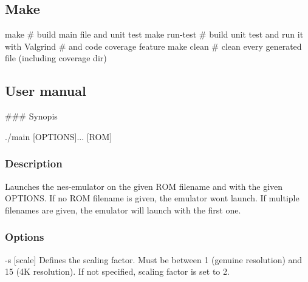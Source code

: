 \subsection*{Make}


\begin{DoxyCode}
make            # build main file and unit test
make run-test   # build unit test and run it with Valgrind
                # and code coverage feature
make clean      # clean every generated file (including coverage dir)
\end{DoxyCode}


\subsection*{User manual}

\#\#\# Synopis 
\begin{DoxyCode}
./main [OPTIONS]... [ROM]
\end{DoxyCode}


\subsubsection*{Description}

Launches the nes-\/emulator on the given R\+OM filename and with the given O\+P\+T\+I\+O\+NS. If no R\+OM filename is given, the emulator won\textquotesingle{}t launch. If multiple filenames are given, the emulator will launch with the first one.

\subsubsection*{Options}

\begin{DoxyVerb}-s [scale]
  Defines the scaling factor. Must be between 1 (genuine resolution) and 15 (4K resolution).
  If not specified, scaling factor is set to 2.\end{DoxyVerb}
 